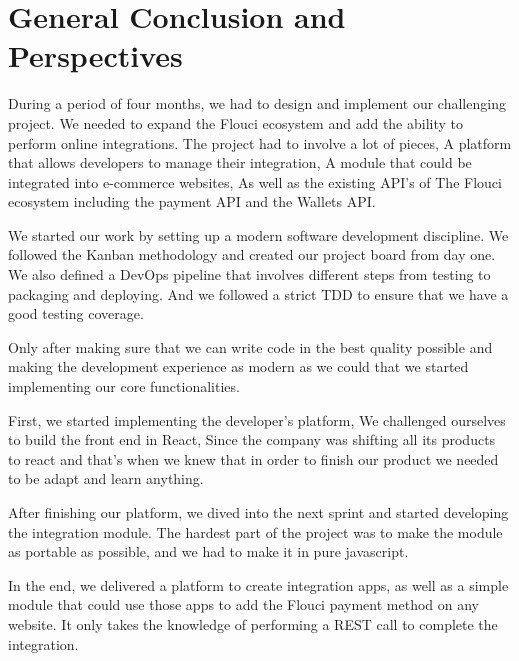 \chapter{General Conclusion and Perspectives }
\pagestyle{fancy}
\fancyhf{}
\fancyhead[R]{\bfseries\rightmark}
\fancyfoot[R]{\thepage}
\renewcommand{\headrulewidth}{0.5pt}
\renewcommand{\footrulewidth}{0pt}
\renewcommand{\chaptermark}[1]{\markboth{\MakeUppercase{\chaptername~\thechapter. #1 }}{}}
\renewcommand{\sectionmark}[1]{\markright{\thechapter.\thesection~ #1}}

\begin{spacing}{1.2}
During a period of four months, we had to design and implement our challenging project. We needed to expand the Flouci ecosystem and add the ability to perform online integrations.
The project had to involve a lot of pieces, A platform that allows developers to manage their integration, A module that could be integrated into e-commerce websites, As well as the existing API's of The Flouci ecosystem including the payment API and the Wallets API.   

We started our work by setting up a modern software development discipline. We followed the Kanban methodology and created our project board from day one. We also defined a DevOps pipeline that involves different steps from testing to packaging and deploying. And we followed a strict TDD to ensure that we have a good testing coverage. 

Only after making sure that we can write code in the best quality possible and making the development experience as modern as we could that we started implementing our core functionalities. 

First, we started implementing the developer's platform, We challenged ourselves to build the front end in React, Since the company was shifting all its products to react and that's when we knew that in order to finish our product we needed to be adapt and learn anything.

After finishing our platform, we dived into the next sprint and started developing the integration module. The hardest part of the project was to make the module as portable as possible, and we had to make it in pure javascript.  

In the end, we delivered a platform to create integration apps, as well as a simple module that could use those apps to add the Flouci payment method on any website. It only takes the knowledge of performing a REST call to complete the integration.


\end{spacing}
